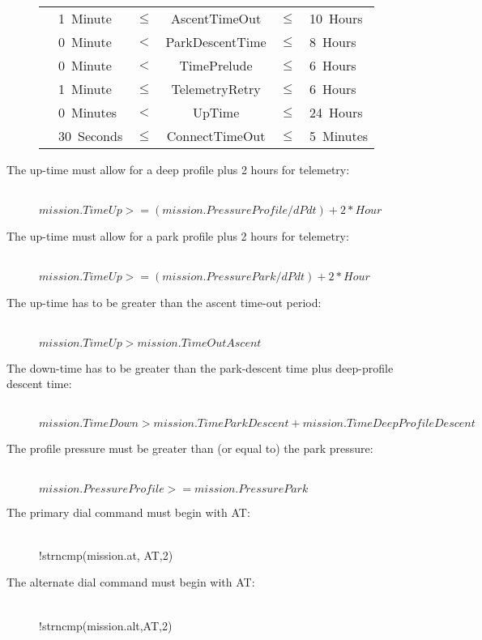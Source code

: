 \begin{description}
\begin{minipage}{6in}
\begin{tabular}{llcccl}
    & 1~Minute   & $\le$ & AscentTimeOut              & $\le$ & 10~Hours      \\
    & 0~Minute   & $<$   & ParkDescentTime            & $\le$ & 8~Hours       \\
    & 0~Minute   & $<$   & TimePrelude                & $\le$ & 6~Hours       \\
    & 1~Minute   & $\le$ & TelemetryRetry             & $\le$ & 6~Hours       \\
    & 0~Minutes  & $<$   & UpTime                     & $\le$ & 24~Hours      \\
    & 30~Seconds & $\le$ & ConnectTimeOut             & $\le$ & 5~Minutes     \\
  \end{tabular}
\end{minipage}
  
\item[\textnormal{The up-time must allow for a deep profile plus 2 hours for telemetry:}]\ \\
  $mission.TimeUp >= (mission.PressureProfile/dPdt) + 2*Hour$
  
\item[\textnormal{The up-time must allow for a park profile plus 2 hours for telemetry:}]\ \\
  $mission.TimeUp >= (mission.PressurePark/dPdt) + 2*Hour$
  
\item[\textnormal{The up-time has to be greater than the ascent time-out period:}]\ \\
  $mission.TimeUp > mission.TimeOutAscent$

\item[\textnormal{The down-time has to be greater than the park-descent time plus deep-profile descent time:}]\ \\
  $mission.TimeDown > mission.TimeParkDescent+mission.TimeDeepProfileDescent$

\item[\textnormal{The profile pressure must be greater than (or equal to) the park pressure:}]\ \\
  $mission.PressureProfile >= mission.PressurePark$

\item[\textnormal{The primary dial command must begin with AT:}]\ \\
  !strncmp(mission.at, AT,2)

\item[\textnormal{The alternate dial command must begin with AT:}]\ \\
  !strncmp(mission.alt,AT,2)

\end{description}

